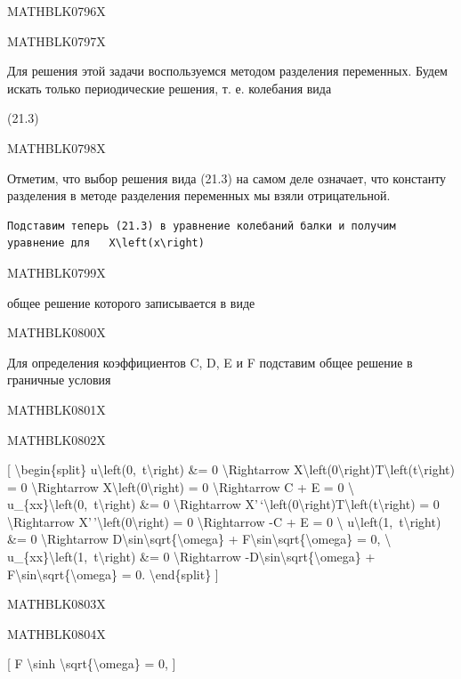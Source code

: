 \documentclass[
]{article}
\begin{document}
MATHBLK0796X

MATHBLK0797X

Для решения этой задачи воспользуемся методом разделения переменных.
Будем искать только периодические решения, т. е. колебания вида

(21.3)

MATHBLK0798X

Отметим, что выбор решения вида (21.3) на самом деле означает, что
константу разделения в методе разделения переменных мы взяли
отрицательной.

\begin{verbatim}
Подставим теперь (21.3) в уравнение колебаний балки и получим уравнение для   X\left(x\right)
\end{verbatim}

MATHBLK0799X

общее решение которого записывается в виде

MATHBLK0800X

Для определения коэффициентов C, D, E и F подставим общее решение в
граничные условия

MATHBLK0801X

MATHBLK0802X

{[} \textbackslash begin\{split\}
u\textbackslash left(0,~t\textbackslash right) \&= 0
\textbackslash Rightarrow
X\textbackslash left(0\textbackslash right)T\textbackslash left(t\textbackslash right)
= 0 \textbackslash Rightarrow
X\textbackslash left(0\textbackslash right) = 0
\textbackslash Rightarrow C + E = 0 \textbackslash{}
u\_\{xx\}\textbackslash left(0,~t\textbackslash right) \&= 0
\textbackslash Rightarrow
X'\,`\textbackslash left(0\textbackslash right)T\textbackslash left(t\textbackslash right)
= 0 \textbackslash Rightarrow
X'\,'\textbackslash left(0\textbackslash right) = 0
\textbackslash Rightarrow -C + E = 0 \textbackslash{}
u\textbackslash left(1,~t\textbackslash right) \&= 0
\textbackslash Rightarrow
D\textbackslash sin\textbackslash sqrt\{\textbackslash omega\} +
F\textbackslash sin\textbackslash sqrt\{\textbackslash omega\} = 0,
\textbackslash{} u\_\{xx\}\textbackslash left(1,~t\textbackslash right)
\&= 0 \textbackslash Rightarrow
-D\textbackslash sin\textbackslash sqrt\{\textbackslash omega\} +
F\textbackslash sin\textbackslash sqrt\{\textbackslash omega\} = 0.
\textbackslash end\{split\} {]}

MATHBLK0803X

MATHBLK0804X

{[} F \textbackslash sinh \textbackslash sqrt\{\textbackslash omega\} =
0, {]}
\end{document}
